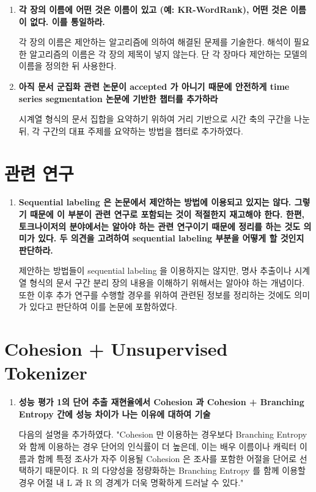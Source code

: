 \documentclass[11pt]{article}
\begin{document}
\begin{enumerate}
\item \textbf{각 장의 이름에 어떤 것은 이름이 있고 (예: KR-WordRank), 어떤 것은 이름이 없다. 이를 통일하라.}

각 장의 이름은 제안하는 알고리즘에 의하여 해결된 문제를 기술한다. 해석이 필요한 알고리즘의 이름은 각 장의 제목이 넣지 않는다. 단 각 장마다 제안하는 모델의 이름을 정의한 뒤 사용한다.

\item \textbf{아직 문서 군집화 관련 논문이 accepted 가 아니기 때문에 안전하게 time series segmentation 논문에 기반한 챕터를 추가하라}

시계열 형식의 문서 집합을 요약하기 위하여 거리 기반으로 시간 축의 구간을 나눈 뒤, 각 구간의 대표 주제를 요약하는 방법을 챕터로 추가하였다.

\end{enumerate}


\section{관련 연구}
\begin{enumerate}
\item \textbf{Sequential labeling 은 논문에서 제안하는 방법에 이용되고 있지는 않다. 그렇기 때문에 이 부분이 관련 연구로 포함되는 것이 적절한지 재고해야 한다. 한편, 토크나이저의 분야에서는 알아야 하는 관련 연구이기 때문에 정리를 하는 것도 의미가 있다. 두 의견을 고려하여 sequential labeling 부분을 어떻게 할 것인지 판단하라.}

제안하는 방법들이 sequential labeling 을 이용하지는 않지만, 명사 추출이나 시계열 형식의 문서 구간 분리 장의 내용을 이해하기 위해서는 알아야 하는 개념이다.
또한 이후 추가 연구를 수행할 경우를 위하여 관련된 정보를 정리하는 것에도 의미가 있다고 판단하여 이를 논문에 포함하였다.

\end{enumerate}


\section{Cohesion + Unsupervised Tokenizer}
\begin{enumerate}
\item \textbf{성능 평가 1의 단어 추출 재현율에서 Cohesion 과 Cohesion + Branching Entropy 간에 성능 차이가 나는 이유에 대하여 기술}

다음의 설명을 추가하였다.
"Cohesion 만 이용하는 경우보다 Branching Entropy 와 함께 이용하는 경우 단어의 인식률이 더 높은데, 이는 배우 이름이나 캐릭터 이름과 함께 특정 조사가 자주 이용될 Cohesion 은 조사를 포함한 어절을 단어로 선택하기 때문이다.
R 의 다양성을 정량화하는 Branching Entropy 를 함께 이용할 경우 어절 내 L 과 R 의 경계가 더욱 명확하게 드러날 수 있다."

\end{enumerate}
\end{document}
